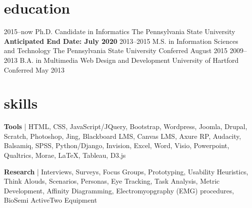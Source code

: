 \documentclass[]{cv-style}          %
\begin{document}
\section{education}
\vspace{-0.3cm}
\begin{entrylist}
\entry
{2015--now}
{Ph.D. Candidate {\normalfont in Informatics}}
{The Pennsylvania State University}
{}
\textbf{Anticipated End Date: July 2020}
\entry 
{2013--2015}
{M.S. {\normalfont in Information Sciences and Technology}}
{The Pennsylvania State University}
{{\normalfont Conferred August 2015}}
\entry
{2009--2013}
{B.A. {\normalfont in Multimedia Web Design and Development}}
{University of Hartford}
{{\normalfont Conferred May 2013 }}
\end{entrylist}
\section{skills}
  \vspace{-0.2cm}
  
{\textbf{Tools} | HTML, CSS, JavaScript/JQuery, Bootstrap, Wordpress, Joomla, Drupal, Scratch, Photoshop, Jing, Blackboard LMS, Canvas LMS, Axure RP, Audacity, Balsamiq, SPSS, Python/Django, Invision, Excel, Word, Visio, Powerpoint, Qualtrics, Morae, \LaTeX{}, Tableau, D3.js}

{\textbf{Research} | Interviews, Surveys, Focus Groups, Prototyping, Usability Heuristics, Think Alouds, Scenarios, Personas, Eye Tracking, Task Analysis, Metric Development, Affinity Diagramming, Electromyopgraphy (EMG) procedures, BioSemi ActiveTwo Equipment}
\end{document}
